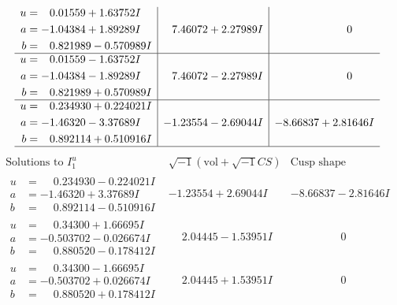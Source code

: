 \documentclass[1p]{elsarticle_modified}
\theoremstyle{definition}
\newcommand{\I}{\sqrt{-1}}
\begin{document}
$$\begin{array}{c|c|c}
\begin{aligned}
u &= \phantom{-}0.01559 + 1.63752 I \\
a &= -1.04384 + 1.89289 I \\
b &= \phantom{-}0.821989 - 0.570989 I\end{aligned}
 & \phantom{-}7.46072 + 2.27989 I & \phantom{-0.000000 } 0 \\ \hline\begin{aligned}
u &= \phantom{-}0.01559 - 1.63752 I \\
a &= -1.04384 - 1.89289 I \\
b &= \phantom{-}0.821989 + 0.570989 I\end{aligned}
 & \phantom{-}7.46072 - 2.27989 I & \phantom{-0.000000 } 0 \\ \hline\begin{aligned}
u &= \phantom{-}0.234930 + 0.224021 I \\
a &= -1.46320 - 3.37689 I \\
b &= \phantom{-}0.892114 + 0.510916 I\end{aligned}
 & -1.23554 - 2.69044 I & -8.66837 + 2.81646 I\\
 \hline 
 \end{array}$$\newpage$$\begin{array}{c|c|c}  
\text{Solutions to }I^u_{1}& \I (\text{vol} + \sqrt{-1}CS) & \text{Cusp shape}\\
 \hline 
\begin{aligned}
u &= \phantom{-}0.234930 - 0.224021 I \\
a &= -1.46320 + 3.37689 I \\
b &= \phantom{-}0.892114 - 0.510916 I\end{aligned}
 & -1.23554 + 2.69044 I & -8.66837 - 2.81646 I \\ \hline\begin{aligned}
u &= \phantom{-}0.34300 + 1.66695 I \\
a &= -0.503702 - 0.026674 I \\
b &= \phantom{-}0.880520 - 0.178412 I\end{aligned}
 & \phantom{-}2.04445 - 1.53951 I & \phantom{-0.000000 } 0 \\ \hline\begin{aligned}
u &= \phantom{-}0.34300 - 1.66695 I \\
a &= -0.503702 + 0.026674 I \\
b &= \phantom{-}0.880520 + 0.178412 I\end{aligned}
 & \phantom{-}2.04445 + 1.53951 I & \phantom{-0.000000 } 0 \\ \hline\begin{aligned}

\end{aligned}
\end{array}$$
\end{document}
